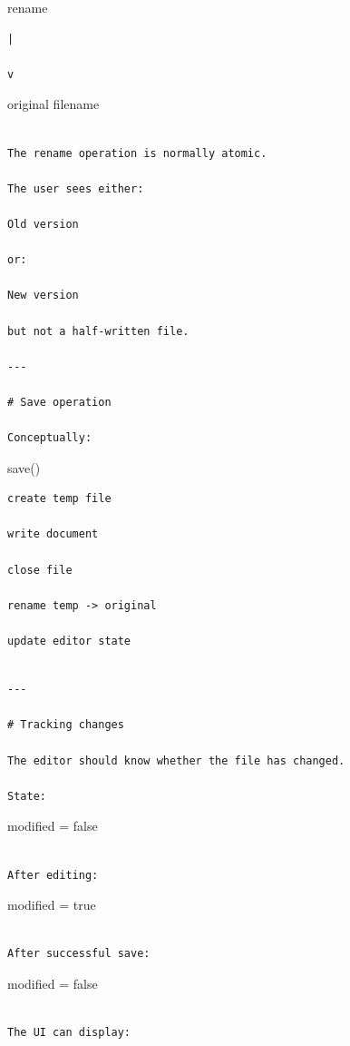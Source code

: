 \documentclass[
  oneside,
  openany]{book}
\begin{document}
rename

\begin{verbatim}
|

v
\end{verbatim}

original filename

\begin{verbatim}

The rename operation is normally atomic.

The user sees either:

Old version

or:

New version

but not a half-written file.

---

# Save operation

Conceptually:
\end{verbatim}

save()

\begin{verbatim}
create temp file

write document

close file

rename temp -> original

update editor state
\end{verbatim}

\begin{verbatim}

---

# Tracking changes

The editor should know whether the file has changed.

State:
\end{verbatim}

modified = false

\begin{verbatim}

After editing:
\end{verbatim}

modified = true

\begin{verbatim}

After successful save:
\end{verbatim}

modified = false

\begin{verbatim}

The UI can display:
\end{verbatim}
\end{document}

